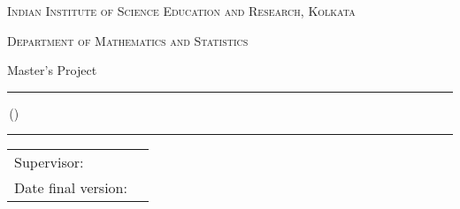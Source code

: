 \begin{titlepage}
	\makeatletter
	\begin{center}
		\textsc{Indian Institute of Science Education and Research, Kolkata} %
		\par \textsc{Department of Mathematics and Statistics} %
		\par Master's Project \program %

		\vfill \hrule height .08em \bigskip
		\par\huge\@title\bigskip
		\par\Large\@author\,(\studentnumber)\bigskip
		\hrule height .08em\normalsize

		\vfill %
		\vfill

		\begin{tabular}{ll}
			\toprule
			Supervisor: & \supervisor\\
			Date final version: & \@date\\
			\bottomrule
		\end{tabular}

		\vfill
	\end{center}
	\makeatother
\end{titlepage}
